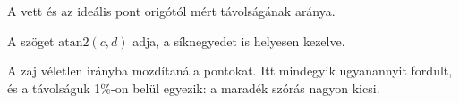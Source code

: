 A vett és az ideális pont origótól mért távolságának aránya.

\begin{center}\end{center}

A szöget $\mathrm{atan2}(c,d)$ adja, a síknegyedet is helyesen kezelve.

\begin{center}\end{center}

A zaj véletlen irányba mozdítaná a pontokat. Itt mindegyik ugyanannyit fordult, és a távolságuk 1\%-on belül egyezik: a maradék szórás nagyon kicsi.

